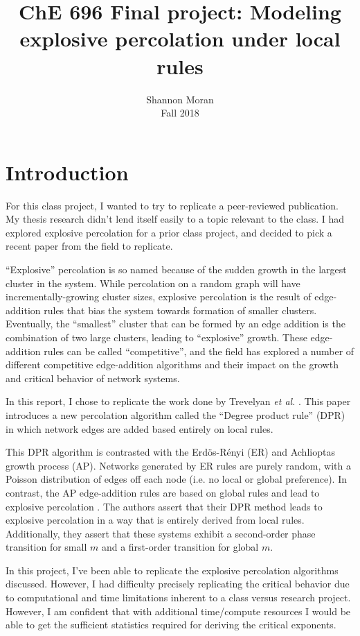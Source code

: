 \documentclass[11pt]{article}   	%
\title{ChE 696 Final project: Modeling explosive percolation under local rules}
\author{Shannon Moran \\ Fall 2018}
\date{}
\begin{document}
\maketitle

\section{Introduction}

For this class project, I wanted to try to replicate a peer-reviewed publication. My thesis research didn't lend itself easily to a topic relevant to the class. I had explored explosive percolation for a prior class project, and decided to pick a recent paper from the field to replicate.

``Explosive'' percolation is so named because of the sudden growth in the largest cluster in the system. While percolation on a random graph will have incrementally-growing cluster sizes, explosive percolation is the result of edge-addition rules that bias the system towards formation of smaller clusters. Eventually, the ``smallest'' cluster that can be formed by an edge addition is the combination of two large clusters, leading to ``explosive'' growth. These edge-addition rules can be called ``competitive'', and the field has explored a number of different competitive edge-addition algorithms and their impact on the growth and critical behavior of network systems.

In this report, I chose to replicate the work done by Trevelyan \textit{et al.} \cite{DPR_paper}. This paper introduces a new percolation algorithm called the ``Degree product rule'' (DPR) in which network edges are added based entirely on local rules.

This DPR  algorithm is contrasted with the Erd\"{o}s-R\'{e}nyi (ER) and Achlioptas growth process (AP). Networks generated by ER rules are purely random, with a Poisson distribution of edges off each node (i.e. no local or global preference). In contrast, the AP edge-addition rules are based on global rules and lead to explosive percolation \cite{AP_paper}. The authors assert that their DPR method leads to explosive percolation in a way that is entirely derived from local rules. Additionally, they assert that these systems exhibit a second-order phase transition for small $m$ and a first-order transition for global $m$.

In this project, I've been able to replicate the explosive percolation algorithms discussed. However, I had difficulty precisely replicating the critical behavior due to computational and time limitations inherent to a class versus research project. However, I am confident that with additional time/compute resources I would be able to get the sufficient statistics required for deriving the critical exponents.
\end{document}
